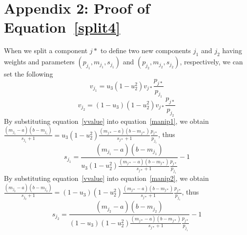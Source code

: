 \documentclass[journal,10pt]{elsart}
\begin{document}
\section*{Appendix 2: Proof of Equation~\ref{split4}}\label{appendix2}
When we split a component $j*$ to define two new components $j_1$ and $j_2$ having weights and parameters $(p_{j_1},m_{j_1},s_{j_1})$ and $(p_{j_2},m_{j_2},s_{j_2})$, respectively, we can set the following \cite{Green1997}
\begin{equation}\label{manip1}
v_{j_1}=u_3(1-u_2^2)v_{j*}\frac{p_{j*}}{p_{j_1}}
\end{equation}
\begin{equation}\label{manip2}
v_{j_2}=(1-u_3)(1-u_2^2)v_{j*}\frac{p_{j*}}{p_{j_2}}
\end{equation}
By substituting equation~\ref{vvalue} into equation~\ref{manip1}, we obtain
$
\frac{(m_{j_1}-a)(b-m_{j_1})}{s_{j_1}+1}=u_3(1-u_2^2)\frac{(m_{j*}-a)(b-m_{j*})}{s_{j*}+1}\frac{p_{j*}}{p_{j_1}}
$, thus
\begin{equation*}
s_{j_1}=\frac{(m_{j_1}-a)(b-m_{j_1})}{u_3(1-u_2^2)\frac{(m_{j*}-a)(b-m_{j*})}{s_{j*}+1}\frac{p_{j*}}{p_{j_1}}}-1
\end{equation*}
By substituting equation~\ref{vvalue} into equation~\ref{manip2}, we obtain
$
\frac{(m_{j_2}-a)(b-m_{j_2})}{s_{j_2}+1}=(1-u_3)(1-u_2^2)\frac{(m_{j*}-a)(b-m_{j*})}{s_{j*}+1}\frac{p_{j*}}{p_{j_1}}$, thus
\begin{equation*}
s_{j_2}=\frac{(m_{j_2}-a)(b-m_{j_2})}{(1-u_3)(1-u_2^2)\frac{(m_{j*}-a)(b-m_{j*})}{s_{j*}+1}\frac{p_{j*}}{p_{j_1}}}-1
\end{equation*}
\end{document}
